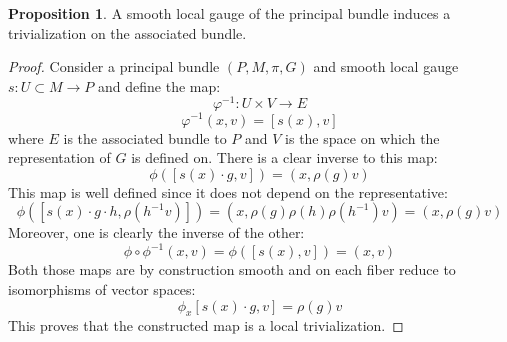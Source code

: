 \documentclass[12pt,a4paper]{report}
\theoremstyle{definition}
\theoremstyle{Theorem}
\newtheorem{Prop}[Def]{Proposition}
\theoremstyle{definition}
\theoremstyle{definition}
\begin{document}
	\begin{Prop}\label{Prop_6.2.3}
		A smooth local gauge of the principal bundle induces a trivialization on the associated bundle.
	\end{Prop}
	\begin{proof}
		Consider a principal bundle $(P,M,\pi,G)$ and smooth local gauge $s:U\subset M\rightarrow P$ and define the map:
		$$\varphi^{-1}:U\times V\rightarrow E$$
		$$\varphi^{-1}(x,v)=[s(x),v]$$
		where $E$ is the associated bundle to $P$ and $V$ is the space on which the representation of $G$ is defined on.
		There is a clear inverse to this map:
		$$\phi([s(x)\cdot g,v])=(x,\rho(g)v)$$
		This map is well defined since it does not depend on the representative:
		$$\phi([s(x)\cdot g\cdot h,\rho(h^{-1}v)])=(x,\rho(g)\rho(h)\rho(h^{-1})v)=(x,\rho(g)v)$$
		Moreover, one is clearly the inverse of the other:
		$$\phi\circ \phi^{-1}(x,v)=\phi([s(x),v])=(x,v)$$ 
		Both those maps are by construction smooth and on each fiber reduce to isomorphisms of vector spaces:
		$$\phi_x[s(x)\cdot g,v]=\rho(g)v$$
		This proves that the constructed map is a local trivialization.
	\end{proof}
\end{document}
